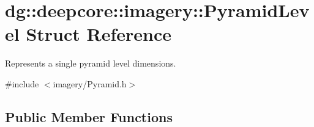 \hypertarget{structdg_1_1deepcore_1_1imagery_1_1_pyramid_level}{}\section{dg\+:\+:deepcore\+:\+:imagery\+:\+:Pyramid\+Level Struct Reference}
\label{structdg_1_1deepcore_1_1imagery_1_1_pyramid_level}


Represents a single pyramid level dimensions.  




{\ttfamily \#include $<$imagery/\+Pyramid.\+h$>$}

\subsection*{Public Member Functions}
